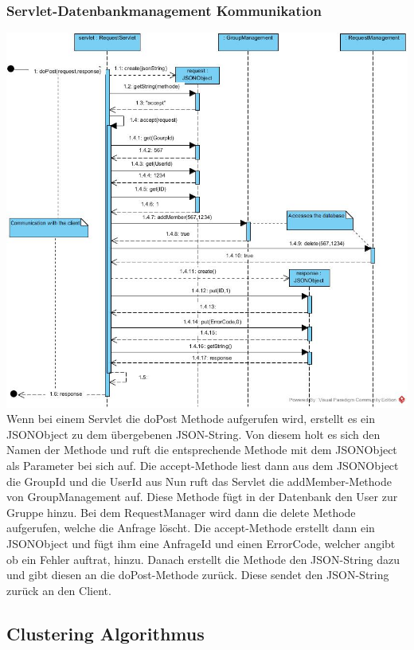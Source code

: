 \hypertarget{ServletDatenbank}{}
\subsubsection{Servlet-Datenbankmanagement Kommunikation}

\includegraphics[width=1.1\textwidth]{Servlet_MAnagement.jpg}
Wenn bei einem Servlet die doPost Methode aufgerufen wird, erstellt es ein JSONObject zu dem übergebenen JSON-String.
Von diesem holt es sich den Namen der Methode und ruft die entsprechende Methode mit dem JSONObject als Parameter bei sich auf. Die accept-Methode liest dann aus dem JSONObject die GroupId und die UserId aus %
Nun ruft das Servlet die addMember-Methode von GroupManagement auf. Diese Methode fügt in der Datenbank den User zur Gruppe hinzu. %
Bei dem RequestManager wird dann die delete Methode aufgerufen, welche die Anfrage löscht. Die accept-Methode erstellt dann ein JSONObject und fügt ihm eine AnfrageId und einen ErrorCode, welcher angibt ob ein Fehler auftrat, hinzu. Danach erstellt die Methode den JSON-String dazu und gibt diesen an die doPost-Methode zurück. Diese sendet den JSON-String zurück an den Client.

\subsection{Clustering Algorithmus}
	
	\newpage